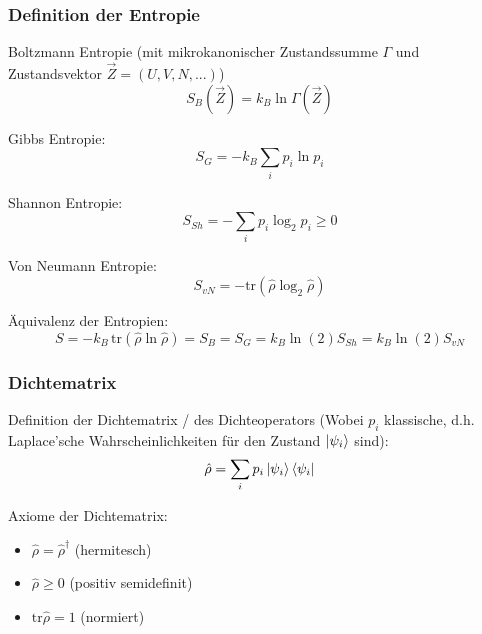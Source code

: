 \documentclass[11pt]{article}
\numberwithin{equation}{section}
\begin{document}
        \subsubsection{Definition der Entropie}
          Boltzmann Entropie (mit mikrokanonischer Zustandssumme $\Gamma$ und Zustandsvektor $\vec{Z}=(U,V,N,...)$)
          \begin{equation}
            S_{B}(\vec{Z}) = k_B \ln\Gamma(\vec{Z})
          \end{equation}

          Gibbs Entropie:
          \begin{equation}
            S_{G} = -k_B \sum_i p_i \ln p_i
          \end{equation}

          Shannon Entropie:
          \begin{equation}
            S_{Sh} = -\sum_i p_i\log_2{p_i} \ge 0
          \end{equation}

          Von Neumann Entropie:
          \begin{equation}
            S_{vN} = -\mathrm{tr}(\hat{\rho}\log_2\hat{\rho})
          \end{equation}

          Äquivalenz der Entropien:
          \begin{equation}
            S = -k_B\,\mathrm{tr}(\hat{\rho} \ln \hat{\rho}) = S_B = S_G = k_B\ln(2) S_{Sh} = k_B\ln(2) S_{vN}
          \end{equation}

        \subsubsection{Dichtematrix}
          Definition der Dichtematrix / des Dichteoperators (Wobei $p_i$ klassische, d.h. Laplace'sche Wahrscheinlichkeiten für den Zustand $\Ket{\psi_i}$ sind):
          \begin{equation}
            \hat{\rho} = \sum_i p_i \Ket{\psi_i}\Bra{\psi_i}
          \end{equation}

          Axiome der Dichtematrix:
          \begin{itemize}\itemsep -0pt  %
            \item $\hat{\rho} = \hat{\rho}^\dagger$ \hfill{(hermitesch)}
            \item $\hat{\rho} \ge 0 $ \hfill{(positiv semidefinit)}
            \item $\mathrm{tr} \hat{\rho} = 1$ \hfill{(normiert)}
          \end{itemize}
\end{document}
